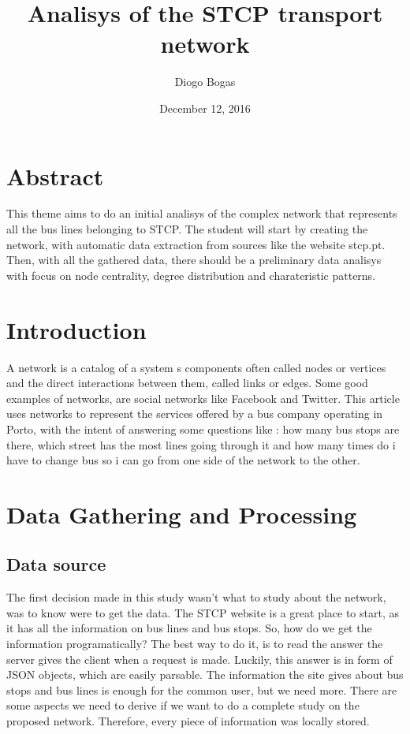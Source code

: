 \documentclass[12pt]{article}
\title{Analisys of the STCP transport network}
\author{Diogo Bogas}
\affil{DCC/FCUP}
\date{December 12, 2016}
\begin{document}
\maketitle
\newpage
{}

\tableofcontents


\section{Abstract}
This theme aims to do an initial analisys of the complex network that represents all the bus lines belonging to STCP. The student will start by creating the network, with automatic data extraction from sources like the website stcp.pt.
Then, with all the gathered data, there should be a preliminary data analisys with focus on node centrality, degree distribution and charateristic patterns.

\section{Introduction}

A network is a catalog of a system\textsc{} s components often called nodes or vertices and the direct interactions between them, called links or edges.
Some good examples of networks, are social networks like Facebook and Twitter.
This article uses networks to represent the services offered by a bus company operating in Porto, with the intent of answering some questions like : how many bus stops are there, which street has the most lines going through it and how many times do i have to change bus so i can go from one side of the network to the other. 
 

\section{Data Gathering and Processing}

\subsection{Data source}
The first decision made in this study wasn't what to study about the network, was to know were to get the data. 
The STCP website is a great place to start, as it has all the information on bus lines and bus stops. So, how do we get the information programatically?
The best way to do it, is to read the answer the server gives the client when a request is made. Luckily, this answer is in form of JSON objects, which are easily parsable.
The information the site gives about bus stops and bus lines is enough for the common user, but we need more. There are some aspects we need to derive if we want to do a complete study on the proposed network. Therefore, every piece of information was locally stored.
\end{document}
